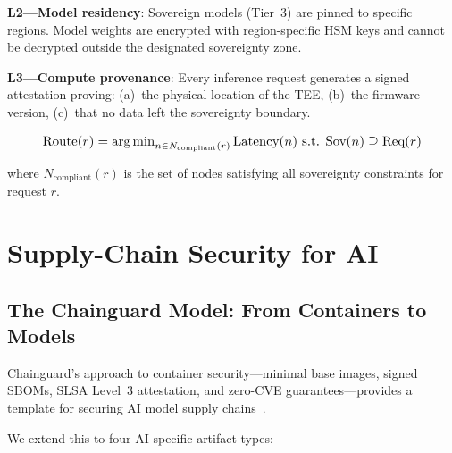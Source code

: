 \documentclass[conference,10pt]{IEEEtran}
\DeclareMathOperator*{\argmin}{arg\,min}
\begin{document}
\textbf{L2---Model residency}: Sovereign models (Tier~3) are pinned to specific regions. Model weights are encrypted with region-specific HSM keys and cannot be decrypted outside the designated sovereignty zone.

\textbf{L3---Compute provenance}: Every inference request generates a signed attestation proving: (a)~the physical location of the TEE, (b)~the firmware version, (c)~that no data left the sovereignty boundary.

\begin{equation}
\resizebox{0.88\linewidth}{!}{$
\text{Route}(r) = \argmin_{n \in N_{\text{compliant}}(r)} \text{Latency}(n) \text{ s.t. } \text{Sov}(n) \supseteq \text{Req}(r)
$}
\end{equation}

\noindent where $N_{\text{compliant}}(r)$ is the set of nodes satisfying all sovereignty constraints for request $r$.


\section{Supply-Chain Security for AI}
\label{sec:supply}

\subsection{The Chainguard Model: From Containers to Models}

Chainguard's approach to container security---minimal base images, signed SBOMs, SLSA Level~3 attestation, and zero-CVE guarantees---provides a template for securing AI model supply chains~\cite{chainguard2025ai,slsa2024,sigstore2024}.

We extend this to four AI-specific artifact types:

\begin{table}[!htbp]
\caption{AI Supply-Chain Attestation Framework}
\label{tab:supply}
\centering\scriptsize
{}
\end{table}
\end{document}
